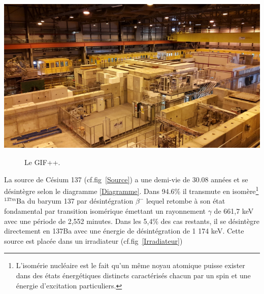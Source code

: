 \marginpar
{
	\centering
	\includegraphics[width=\marginparwidth]{GLA/GIF2.png}
	\label{GIF2}
}

\begin{figure}[ht!]
	\centering
	\hfill
	\caption{Le GIF++.}
	\label{GIF}
\end{figure}


La source de Césium 137 (cf.fig~\ref{Source}) a une demi-vie de 30.08 années et se désintègre selon le diagramme \ref{Diagramme}. Dans 94.6\% il transmute en isomère\footnote{L’isomérie nucléaire est le fait qu'un même noyau atomique puisse exister dans des états énergétiques distincts caractérisés chacun par un spin et une énergie d'excitation particuliers.} $^{137m}$Ba du baryum 137 par désintégration $\beta^{-}$ lequel retombe à son état fondamental par transition isomérique émettant un rayonnement $\gamma$ de 661,7 keV avec une période de 2,552 minutes. Dans les 5,4\% des cas restants, il se désintègre directement en 137Ba avec une énergie de désintégration de 1 174 keV. Cette source est placée dans un irradiateur (cf.fig~\ref{Irradiateur})

